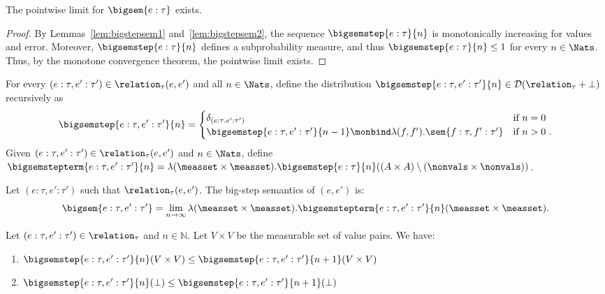 \begin{lemma}
	The pointwise limit for $\bigsem{e : \tau}$ exists.
\end{lemma}

\begin{proof}
	By Lemmas~\ref{lem:bigstepsem1} and~\ref{lem:bigstepsem2}, the sequence $\bigsemstep{e : \tau}{n}$ is monotonically increasing for values and error. Moreover, $\bigsemstep{e : \tau}{n}$ defines a subprobability measure, and thus $\bigsemstep{e : \tau}{n} \leq 1$ for every $n \in \Nats$. Thus, by the monotone convergence theorem, the pointwise limit exists.
\end{proof}

\begin{definition}\label{def:big-step-2}
	For every $(e : \tau, e' : \tau') \in \relation_{\tau}(e,e')$ and all $n \in \Nats$, define the distribution $\bigsemstep{e : \tau, e' : \tau'}{n} \in \mathcal{D}(\relation_{\tau} + \bot)$ recursively as
	\[
		\bigsemstep{e : \tau, e' : \tau'}{n} = 
		\begin{cases}
			\delta_{(e : \tau. e' : \tau')} & \text{if $n = 0$} \\
			\bigsemstep{e : \tau, e' : \tau'}{n-1} \monbind  \lambda (f,f'). \sem{f : \tau, f' : \tau'} & \text{if $n > 0$}~.
		\end{cases}
	\]
	Given $(e : \tau, e' : \tau') \in \relation_{\tau}(e,e')$ and $n \in \Nats$, define $\bigsemstepterm{e : \tau, e' : \tau'}{n} = \lambda (\measset \times \measset). \bigsemstep{e : \tau}{n}((A \times A) \setminus (\nonvals \times \nonvals))$. 

	Let $(e : \tau, e' : \tau')$ such that $\relation_{\tau}(e,e')$. The big-step semantics of $(e,e')$ is:
	\[
	\bigsem{e : \tau, e' : \tau'} = \lim_{n \to \infty} \lambda (\measset \times \measset).\bigsemstepterm{e : \tau, e' : \tau'}{n}(\measset \times \measset).
	\]
\end{definition}

\begin{lemma}
	Let $(e : \tau, e' : \tau') \in \relation_{\tau}$ and $n \in \mathbb{N}$. Let $V \times V$ be the measurable set of value pairs. We have:
	\begin{enumerate}
		\item\label{lem:bigstepsem1-pairing} $\bigsemstep{e : \tau, e' : \tau'}{n}(V \times V) \leq \bigsemstep{e : \tau, e' : \tau'}{n+1}(V \times V)$
		\item\label{lem:bigstepsem2-pairing} $\bigsemstep{e : \tau, e' : \tau'}{n}(\bot) \leq \bigsemstep{e : \tau, e' : \tau'}{n+1}(\bot)$
	\end{enumerate}
\end{lemma}

